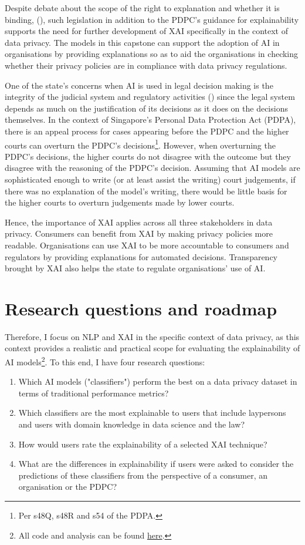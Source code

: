 Despite debate about the scope of the right to explanation and whether it is binding, (\cite{chesterman2021_transparency}), such legislation in addition to the PDPC's guidance for explainability supports the need for further development of XAI specifically in the context of data privacy. The models in this capstone can support the adoption of AI in organisations by providing explanations so as to aid the organisations in checking whether their privacy policies are in compliance with data privacy regulations.

One of the state's concerns when AI is used in legal decision making is the integrity of the judicial system and regulatory activities (\cite{chesterman2021_opacity}) since the legal system depends as much on the justification of its decisions as it does on the decisions themselves. In the context of Singapore's Personal Data Protection Act (PDPA), there is an appeal process for cases appearing before the PDPC and the higher courts can overturn the PDPC's decisions\footnote{Per s48Q, s48R and s54 of the PDPA.}. However, when overturning the PDPC's decisions, the higher courts do not disagree with the outcome but they disagree with the reasoning of the PDPC's decision. Assuming that AI models are sophisticated enough to write (or at least assist the writing) court judgements, if there was no explanation of the model's writing, there would be little basis for the higher courts to overturn judgements made by lower courts. 

Hence, the importance of XAI applies across all three stakeholders in data privacy. Consumers can benefit from XAI by making privacy policies more readable. Organisations can use XAI to be more accountable to consumers and regulators by providing explanations for automated decisions. Transparency brought by XAI also helps the state to regulate organisations' use of AI.

\section{Research questions and roadmap}
\label{chap1:research_questions}
Therefore, I focus on NLP and XAI in the specific context of data privacy, as this context provides a realistic and practical scope for evaluating the explainability of AI models\footnote{All code and analysis can be found \href{https://github.com/TristanKoh/capstone-repo/}{here}.}. To this end, I have four research questions: 

\begin{enumerate}
  \item Which AI models ("classifiers") perform the best on a data privacy dataset in terms of traditional performance metrics?
  \item Which classifiers are the most explainable to users that include laypersons and users with domain knowledge in data science and the law?
  \item How would users rate the explainability of a selected XAI technique?
  \item What are the differences in explainability if users were asked to consider the predictions of these classifiers from the perspective of a consumer, an organisation or the PDPC?
\end{enumerate}

